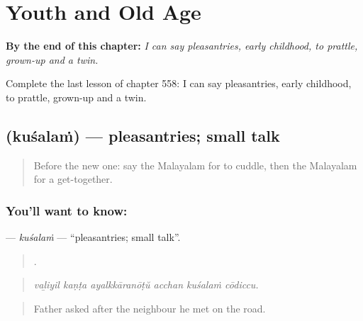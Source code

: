 
\chapter{Youth and Old Age}
\label{ch:ml-youth-and-old-age}

\begin{chapteropening}
\textbf{By the end of this chapter:} \emph{I can say pleasantries, early childhood, to prattle, grown-up and a twin.}

Complete the last lesson of chapter 558: I can say pleasantries, early childhood, to prattle, grown-up and a twin.
\end{chapteropening}

\section[\texorpdfstring{\ml{കുശലം} (kuśalaṁ)}{കുശലം (kuśalaṁ)}]{ (kuśalaṁ) — pleasantries; small talk}

\label{lesson:ML-C558-kusalam}



\begin{quote}
Before the new one: say the Malayalam for to cuddle, then the Malayalam for a get-together.
\end{quote}

\subsection*{You'll want to know: }
\textbf{} — \emph{kuśalaṁ} — \textquotedblleft{}pleasantries; small talk\textquotedblright{}.

\begin{quote}
     .
\end{quote}

\begin{quote}
\emph{vaḻiyil kaṇṭa ayalkkāranōṭŭ acchan kuśalaṁ cōdiccu.}
\end{quote}

\begin{quote}
Father asked after the neighbour he met on the road.
\end{quote}

